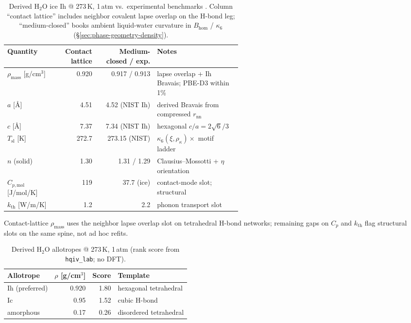 \documentclass[11pt,notitlepage]{amsart}
\newcommand{\fitbox}[1]{\begin{adjustbox}{max width=\linewidth,center}#1\end{adjustbox}}
\begin{document}
\begin{table}[h]
\centering
\caption{Derived $\mathrm{H_2O}$ ice Ih @ 273\,K, 1\,atm vs.\ experimental benchmarks
\cite{nistwebbook_h2o,crc2023handbook,petrenko2002ice}.
Column ``contact lattice'' includes neighbor covalent lapse overlap on the H-bond leg;
``medium-closed'' books ambient liquid-water curvature in $B_{\mathrm{hom}}$ / $\kappa_6$
(\S\ref{sec:phase-geometry-density}).}
\label{tab:h2o-nist}
\begin{threeparttable}
\small
\setlength{\tabcolsep}{4pt}
\fitbox{%
\begin{tabular}{@{}>{\RaggedRight\arraybackslash}p{0.20\linewidth}rr>{\RaggedRight\arraybackslash}p{0.36\linewidth}@{}}
\toprule
Quantity & Contact lattice & Medium-closed / exp. & Notes \\
\midrule
$\rho_{\mathrm{mass}}$ [g/cm$^3$] & 0.920 & 0.917 / 0.913 & lapse overlap + Ih Bravais; PBE-D3 within 1\% \cite{santra2013ice} \\
$a$ [\AA] & 4.51 & 4.52 (NIST Ih) & derived Bravais from compressed $r_{\mathrm{nn}}$ \\
$c$ [\AA] & 7.37 & 7.34 (NIST Ih) & hexagonal $c/a=2\sqrt6/3$ \\
$T_{\mathrm{sl}}$ [K] & 272.7 & 273.15 (NIST) & $\kappa_6(\xi,\rho_\kappa)\times$ motif ladder \\
$n$ (solid) & 1.30 & 1.31 / 1.29 & Clausius--Mossotti + $\eta$ orientation \\
$C_{p,\mathrm{mol}}$ [J/mol/K] & 119 & 37.7 (ice) & contact-mode slot; structural \\
$k_{\mathrm{th}}$ [W/m/K] & 1.2 & 2.2 & phonon transport slot \\
\bottomrule
\end{tabular}}
\begin{tablenotes}\small
\item Contact-lattice $\rho_{\mathrm{mass}}$ uses the neighbor lapse overlap slot on
  tetrahedral H-bond networks; remaining gaps on $C_p$ and $k_{\mathrm{th}}$ flag structural
  slots on the same spine, not ad hoc refits.
\end{tablenotes}
\end{threeparttable}
\end{table}

\begin{table}[h]
\centering
\caption{Derived $\mathrm{H_2O}$ allotropes @ 273\,K, 1\,atm (rank score from
\texttt{hqiv\_lab}; no DFT).}
\label{tab:h2o-allotropes}
\begin{tabular}{@{}lrrl@{}}
\toprule
Allotrope & $\rho$ [g/cm$^3$] & Score & Template \\
\midrule
Ih (preferred) & 0.920 & 1.80 & hexagonal tetrahedral \\
Ic & 0.95 & 1.52 & cubic H-bond \\
amorphous & 0.17 & 0.26 & disordered tetrahedral \\
\bottomrule
\end{tabular}
\end{table}
\end{document}
